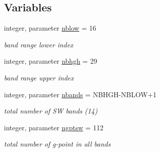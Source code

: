 \subsection*{Variables}
\textbf{ }\par
\begin{DoxyCompactItemize}
\item 
\mbox{\label{namespacemodule__radsw__parameters_a2c5efc91f02dc0d4bdbd5e490f44c19c}} 
integer, parameter \hyperlink{namespacemodule__radsw__parameters_a2c5efc91f02dc0d4bdbd5e490f44c19c}{nblow} = 16
\begin{DoxyCompactList}\small\item\em band range lower index \end{DoxyCompactList}\item 
\mbox{\label{namespacemodule__radsw__parameters_a39e5ca4fd5defbc2545ee39bbf50d61b}} 
integer, parameter \hyperlink{namespacemodule__radsw__parameters_a39e5ca4fd5defbc2545ee39bbf50d61b}{nbhgh} = 29
\begin{DoxyCompactList}\small\item\em band range upper index \end{DoxyCompactList}\item 
\mbox{\label{namespacemodule__radsw__parameters_a8f97b7698e8e5e2aec6e463fd09255cc}} 
integer, parameter \hyperlink{namespacemodule__radsw__parameters_a8f97b7698e8e5e2aec6e463fd09255cc}{nbands} = N\+B\+H\+GH-\/N\+B\+L\+OW+1
\begin{DoxyCompactList}\small\item\em total number of SW bands (14) \end{DoxyCompactList}\item 
\mbox{\label{namespacemodule__radsw__parameters_adc3e4d5a848d50e2883e05c62f61bc97}} 
integer, parameter \hyperlink{namespacemodule__radsw__parameters_adc3e4d5a848d50e2883e05c62f61bc97}{ngptsw} = 112
\begin{DoxyCompactList}\small\item\em total number of g-\/point in all bands \end{DoxyCompactList}\item 
\mbox{\label{namespacemodule__radsw__parameters_a0ba0ff5c18d3303a852d88687b4b5ca9}} 

\end{DoxyCompactItemize}
